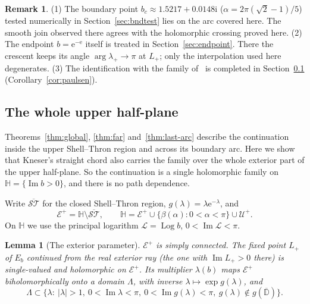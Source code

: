 \documentclass[11pt]{amsart}
\newtheorem{lemma}[theorem]{Lemma}
\theoremstyle{definition}
\newtheorem{remark}[theorem]{Remark}
\newcommand{\eee}{\mathrm{e}}
\newcommand{\ii}{\mathrm{i}}
\begin{document}
\begin{remark}\label{rem:far}
(1) The boundary point $b_c\approx1.5217+0.0148\ii$ ($\alpha=2\pi(\sqrt2-1)/5$) tested
numerically in Section~\ref{sec:bndtest} lies on the arc covered here.  The
smooth join observed there agrees with the holomorphic crossing proved here.
(2) The endpoint $b=\eee^{-\eee}$ itself is treated in Section~\ref{sec:endpoint}.  There the
crescent keeps its angle $\arg\lambda_+\to\pi$ at $L_+$; only the interpolation used here degenerates.
(3) The identification with the family of~\cite{Paulsen2019} is completed in
Section~\ref{sec:upper} (Corollary~\ref{cor:paulsen}).
\end{remark}

\subsection{The whole upper half-plane}\label{sec:upper}
Theorems~\ref{thm:global}, \ref{thm:far} and~\ref{thm:last-arc} describe the
continuation inside the upper Shell--Thron region and across its boundary arc.
Here we show that Kneser's straight chord also carries the family over the
whole exterior part of the upper half-plane.  So the continuation is a single
holomorphic family on $\mathbb H=\{\operatorname{Im}b>0\}$, and there is no path dependence.

Write $\overline{\mathcal{ST}}$ for the closed Shell--Thron region, $g(\lambda)=\lambda\eee^{-\lambda}$, and
\[
 \mathcal E^+=\mathbb H\setminus\overline{\mathcal{ST}},\qquad
 \mathbb H=\mathcal E^+\cup\{\beta(\alpha):0<\alpha<\pi\}\cup\mathcal U^+ .
\]
On $\mathbb H$ we use the principal logarithm $\mathcal L=\operatorname{Log}b$, $0<\operatorname{Im}\mathcal L<\pi$.

\begin{lemma}[The exterior parameter]\label{lem:upper-param}
$\mathcal E^+$ is simply connected.  The fixed point $L_+$ of $E_b$ continued from
the real exterior ray (the one with $\operatorname{Im}L_+>0$ there) is single-valued and
holomorphic on $\mathcal E^+$.  Its multiplier $\lambda(b)$ maps $\mathcal E^+$ biholomorphically onto a
domain $\Lambda$, with inverse $\lambda\mapsto\exp g(\lambda)$, and
\[
 \Lambda\subset\{\lambda:\ |\lambda|>1,\ 0<\operatorname{Im}\lambda<\pi,\ 0<\operatorname{Im}g(\lambda)<\pi,\ g(\lambda)\notin g(\overline{\mathbb D})\}.
\]
\end{lemma}
\end{document}
